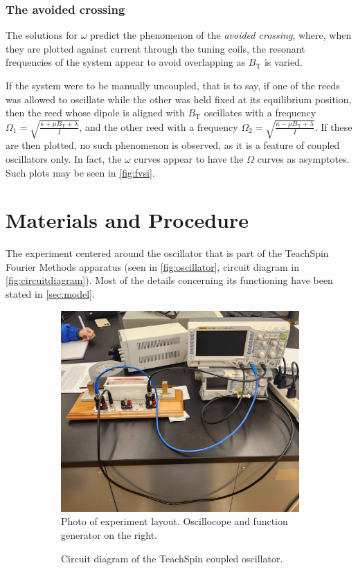 \documentclass{article}
\begin{document}
\subsubsection{The avoided crossing}
The solutions for $\omega$ predict the phenomenon of the \emph{avoided crossing}, where, when they are plotted against current through the tuning coils, the resonant frequencies of the system appear to avoid overlapping as $B_\text{T}$ is varied. 

If the system were to be manually uncoupled, that is to say, if one of the reeds was allowed to oscillate while the other was held fixed at its equilibrium position, then the reed whose dipole is aligned with $B_\text{T}$ oscillates with a frequency $\Omega_1 = \sqrt{\frac{\kappa+\mu B_\text{T}+\lambda}{I}}$, and the other reed with a frequency $\Omega_2 = \sqrt{\frac{\kappa-\mu B_\text{T}+\lambda}{I}}$. If these are then plotted, no such phenomenon is observed, as it is a feature of coupled oscillators only. In fact, the $\omega$ curves appear to have the $\Omega$ curves as asymptotes. Such plots may be seen in \autoref{fig:fvsi}.

\section{Materials and Procedure}
The experiment centered around the oscillator that is part of the TeachSpin Fourier Methods apparatus (seen in \autoref{fig:oscillator}, circuit diagram in \autoref{fig:circuitdiagram}). Most of the details concerning its functioning have been stated in \autoref*{sec:model}.

\begin{figure}
  \centering
  \begin{subfigure}{.45\textwidth}
    \centering
    \includegraphics[width=.8\linewidth]{setup.jpg}
    \caption{Photo of experiment layout. Oscillocope and function generator on the right.}
    \label{fig:setupphoto}
  \end{subfigure}
  \begin{subfigure}{.45\textwidth}
    \centering
    \def\svgwidth{\linewidth}
    
    \caption{Circuit diagram of the TeachSpin coupled oscillator.}
    \label{fig:circuitdiagram}
  \end{subfigure}
  \caption{}
  \label{setup}
\end{figure}
\end{document}
